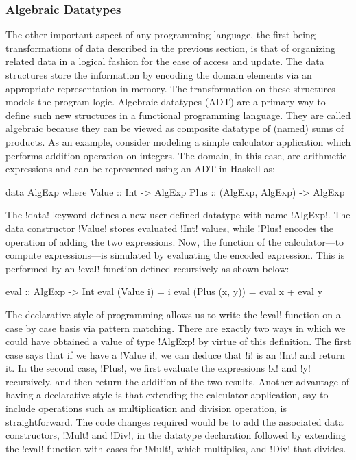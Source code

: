 \documentclass[screen,nonacm]{acmart}
\begin{document}
\subsubsection{Algebraic Datatypes}
The other important aspect of any programming language, the first
being transformations of data described in the previous section, is
that of organizing related data in a logical fashion for the ease of
access and update. The data structures store the information by
encoding the domain elements via an appropriate representation in
memory. The transformation on these structures models the program
logic. Algebraic datatypes (ADT) are a primary way
to define such new structures in a functional programming language. They are called
algebraic because they can be viewed as composite datatype of (named)
sums of products. As an example, consider modeling a simple calculator
application which performs addition operation on integers. The domain,
in this case, are arithmetic expressions and can be represented using an
ADT in Haskell as:

\begin{CenteredBox}
\begin{code}
data AlgExp where
   Value :: Int -> AlgExp
   Plus :: (AlgExp, AlgExp) -> AlgExp
\end{code}
\end{CenteredBox}

The !data! keyword defines a new user defined datatype with name
!AlgExp!. The data constructor !Value! stores evaluated !Int! values,
while !Plus! encodes the operation of adding the two expressions. Now,
the function of the calculator---to compute expressions---is simulated
by evaluating the encoded expression. This is performed by an !eval!
function defined recursively as shown below:

\begin{CenteredBox}
\begin{code}
eval :: AlgExp -> Int
eval (Value i) = i
eval (Plus (x, y)) = eval x + eval y
\end{code}
\end{CenteredBox}

The declarative style of programming allows us to write the !eval!
function on a case by case basis via pattern
matching. There are exactly two ways in which we could have obtained a
value of type !AlgExp! by virtue of this definition. The first case says
that if we have a !Value i!, we can deduce that
!i! is an !Int! and return it. In the second case, !Plus!, we first
evaluate the expressions !x! and !y! recursively, and then return the
addition of the two results. Another advantage of having a declarative
style is that extending the calculator application, say to include
operations such as multiplication and division operation, is
straightforward. The code changes required would be to add the
associated data constructors, !Mult! and !Div!, in the datatype
declaration followed by extending the !eval! function with cases for
!Mult!, which multiplies, and !Div! that divides.
\end{document}

